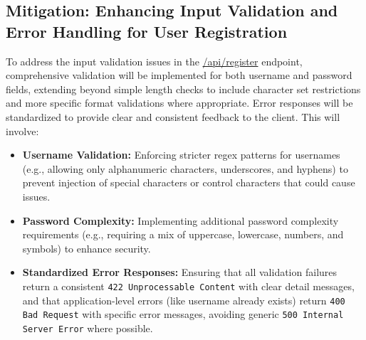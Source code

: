 \documentclass{article}
\begin{document}
\subsection{\texorpdfstring{\textbf{Mitigation: Enhancing Input Validation and Error Handling for User Registration}}{Mitigation: Enhancing Input Validation and Error Handling for User Registration}}
To address the input validation issues in the \url{/api/register} endpoint, comprehensive validation will be implemented for both username and password fields, extending beyond simple length checks to include character set restrictions and more specific format validations where appropriate. Error responses will be standardized to provide clear and consistent feedback to the client. This will involve:
\begin{itemize}
    \item \textbf{Username Validation:}
    Enforcing stricter regex patterns for usernames (e.g., allowing only alphanumeric characters, underscores, and hyphens) to prevent injection of special characters or control characters that could cause issues.
    \item \textbf{Password Complexity:}
    Implementing additional password complexity requirements (e.g., requiring a mix of uppercase, lowercase, numbers, and symbols) to enhance security.
    \item \textbf{Standardized Error Responses:}
    Ensuring that all validation failures return a consistent \texttt{422 Unprocessable Content} with clear detail messages, and that application-level errors (like username already exists) return \texttt{400 Bad Request} with specific error messages, avoiding generic \texttt{500 Internal Server Error} where possible.
\end{itemize}
\end{document}
